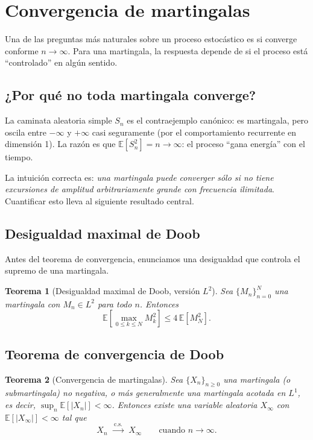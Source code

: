 \documentclass[12pt]{book}
\newtheorem{theorem}{Teorema}[chapter]
\begin{document}
\section{Convergencia de martingalas}

Una de las preguntas más naturales sobre un proceso estocástico es si converge conforme $n \to \infty$. Para una martingala, la respuesta depende de si el proceso está ``controlado'' en algún sentido.

\subsection{¿Por qué no toda martingala converge?}

La caminata aleatoria simple $S_n$ es el contraejemplo canónico: es martingala, pero oscila entre $-\infty$ y $+\infty$ casi seguramente (por el comportamiento recurrente en dimensión 1). La razón es que $\mathbb{E}[S_n^2] = n \to \infty$: el proceso ``gana energía'' con el tiempo.

La intuición correcta es: \emph{una martingala puede converger sólo si no tiene excursiones de amplitud arbitrariamente grande con frecuencia ilimitada}. Cuantificar esto lleva al siguiente resultado central.

\subsection{Desigualdad maximal de Doob}

Antes del teorema de convergencia, enunciamos una desigualdad que controla el supremo de una martingala.

\begin{theorem}[Desigualdad maximal de Doob, versión $L^2$]
    Sea $\{M_n\}_{n=0}^N$ una martingala con $M_n \in L^2$ para todo $n$. Entonces
    \[
        \mathbb{E}\!\left[\max_{0 \le k \le N} M_k^2\right] \le 4\,\mathbb{E}[M_N^2].
    \]
\end{theorem}


\subsection{Teorema de convergencia de Doob}

\begin{theorem}[Convergencia de martingalas]
\label{thm:convergencia_martingala}
    Sea $\{X_n\}_{n \ge 0}$ una martingala (o submartingala) no negativa, o más generalmente una martingala acotada en $L^1$, es decir, $\sup_n \mathbb{E}[|X_n|] < \infty$. Entonces existe una variable aleatoria $X_\infty$ con $\mathbb{E}[|X_\infty|] < \infty$ tal que
    \[
        X_n \;\xrightarrow{\;\text{c.s.}\;}\; X_\infty \qquad \text{cuando } n \to \infty.
    \]
\end{theorem}
\end{document}
